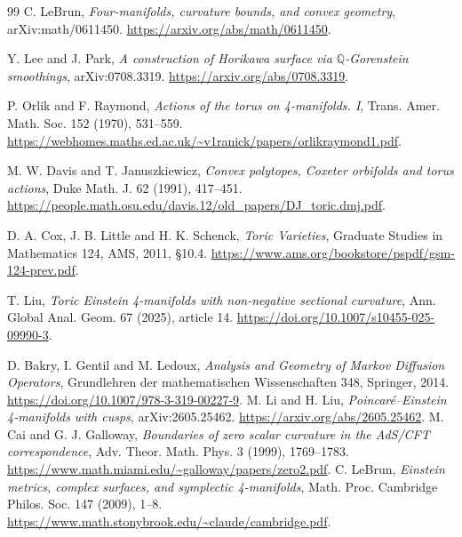 \documentclass[a4paper,11pt]{article}
\numberwithin{equation}{section}
\theoremstyle{definition}
\begin{document}
\begin{thebibliography}{99}
 C. LeBrun,
\emph{Four-manifolds, curvature bounds, and convex geometry},
arXiv:math/0611450. \url{https://arxiv.org/abs/math/0611450}.

 Y. Lee and J. Park,
\emph{A construction of Horikawa surface via $\mathbb Q$-Gorenstein smoothings},
arXiv:0708.3319. \url{https://arxiv.org/abs/0708.3319}.

 P. Orlik and F. Raymond,
\emph{Actions of the torus on 4-manifolds. I}, Trans. Amer. Math. Soc. 152 (1970), 531--559.
\url{https://webhomes.maths.ed.ac.uk/~v1ranick/papers/orlikraymond1.pdf}.

 M. W. Davis and T. Januszkiewicz,
\emph{Convex polytopes, Coxeter orbifolds and torus actions}, Duke Math. J. 62 (1991), 417--451.
\url{https://people.math.osu.edu/davis.12/old_papers/DJ_toric.dmj.pdf}.

 D. A. Cox, J. B. Little and H. K. Schenck,
\emph{Toric Varieties}, Graduate Studies in Mathematics 124, AMS, 2011, \S10.4.
\url{https://www.ams.org/bookstore/pspdf/gsm-124-prev.pdf}.

 T. Liu,
\emph{Toric Einstein 4-manifolds with non-negative sectional curvature},
Ann. Global Anal. Geom. 67 (2025), article 14.
\url{https://doi.org/10.1007/s10455-025-09990-3}.

 D. Bakry, I. Gentil and M. Ledoux, \emph{Analysis and Geometry of Markov Diffusion Operators}, Grundlehren der mathematischen Wissenschaften 348, Springer, 2014. \url{https://doi.org/10.1007/978-3-319-00227-9}.
 M. Li and H. Liu, \emph{Poincar\'e--Einstein 4-manifolds with cusps}, arXiv:2605.25462. \url{https://arxiv.org/abs/2605.25462}.
 M. Cai and G. J. Galloway, \emph{Boundaries of zero scalar curvature in the AdS/CFT correspondence}, Adv. Theor. Math. Phys. 3 (1999), 1769--1783. \url{https://www.math.miami.edu/~galloway/papers/zero2.pdf}.
 C. LeBrun, \emph{Einstein metrics, complex surfaces, and symplectic 4-manifolds}, Math. Proc. Cambridge Philos. Soc. 147 (2009), 1--8. \url{https://www.math.stonybrook.edu/~claude/cambridge.pdf}.
\end{thebibliography}
\end{document}

